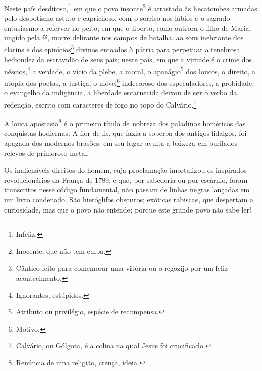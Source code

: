 Neste país desditoso,\footnote{Infeliz.} em que o povo
insonte\footnote{Inocente, que não tem culpa.} é arrastado às
hecatombes armadas pelo despotismo astuto e caprichoso, com o sorriso
nos lábios e o sagrado entusiasmo a referver no peito; em que o liberto,
como outrora o filho de Maria, ungido pela fé, morre delirante nos
campos de batalha, ao som inebriante dos clarins e dos
epinícios\footnote{Cântico feito para comemorar uma vitória ou o
  regozijo por um feliz acontecimento.} divinos entoados à pátria para
perpetuar a tenebrosa hediondez da escravidão de seus pais; neste país,
em que a virtude é o crime dos néscios,\footnote{Ignorantes, estúpidos.}
a verdade, o vício da plebe, a moral, o apanágio\footnote{Atributo ou
  privilégio, espécie de recompensa.} dos loucos, o direito, a utopia
dos poetas, a justiça, o móvel\footnote{Motivo.} indecoroso dos
especuladores, a probidade, o evangelho da indigência, a liberdade
escarnecida deixou de ser o verbo da redenção, escrito com caracteres de
fogo no topo do Calvário.\footnote{Calvário, ou Gólgota, é a colina na
  qual Jesus foi crucificado.\label{calvario}}

A louca apostasia\footnote{Renúncia de uma religião, crença, ideia.} é
o primeiro título de nobreza dos paladinos homéricos das conquistas
hodiernas. A flor de lis, que fazia a soberba dos antigos fidalgos, foi
apagada dos modernos brasões; em seu lugar avulta a baixeza em burilados
relevos de primoroso metal.

Os inalienáveis direitos do homem, cuja proclamação imortalizou
os inspirados revolucionários da França de 1789, e que, por
sabedoria ou por escárnio, foram transcritos nesse código fundamental,
não passam de linhas negras lançadas em um livro condenado. São
hieróglifos obscuros; exóticas rabiscas, que despertam a curiosidade,
mas que o povo não entende; porque este grande povo não sabe ler!

